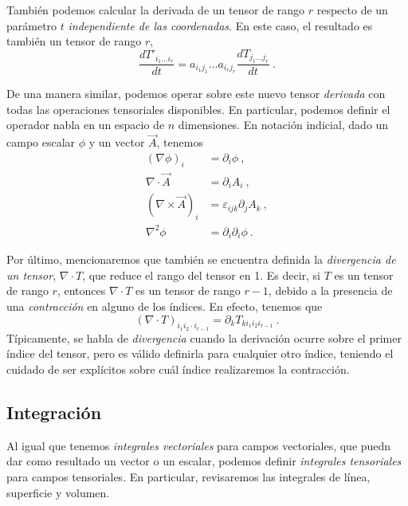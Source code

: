 También podemos calcular la derivada de un tensor de rango $r$ respecto de un parámetro $t$ \emph{independiente de las coordenadas}. En este caso, el resultado es también un tensor de rango $r$,
\begin{equation}
    \frac{d T'_{i_1 \dots i_r}}{dt} = a_{i_1 j_1} \dots a_{i_r j_r} \frac{dT_{j_1 \dots j_r}}{dt} \ . 
\end{equation}

De una manera similar, podemos operar sobre este nuevo tensor \emph{derivada} con todas las operaciones tensoriales disponibles. En particular, podemos definir el operador nabla en un espacio de $n$ dimensiones. En notación indicial, dado un campo escalar $\phi$ y un vector $\vec{A}$, tenemos
\begin{align}
    (\nabla \phi)_i & = \partial_i \phi \ , \\
    \nabla \cdot \vec{A} & = \partial_i A_i \ , \\
    (\nabla \times \vec{A})_i & = \varepsilon_{ijk} \partial_j A_k \ , \\
    \nabla^2 \phi & = \partial_i \partial_i \phi \ .
\end{align}

Por último, mencionaremos que también se encuentra definida la \emph{divergencia de un tensor}, $\nabla \cdot T$, que reduce el rango del tensor en 1. Es decir, si $T$ es un tensor de rango $r$, entonces $\nabla \cdot T$ es un tensor de rango $r-1$, debido a la presencia de una \emph{contracción} en alguno de los índices. En efecto, tenemos que
\begin{equation*}
    (\nabla \cdot T)_{i_1 i_2 \cdot i_{r-1}} = \partial_k T_{k i_1 i_2 i_{r-1}} \ .
\end{equation*}
Típicamente, se habla de \emph{divergencia} cuando la derivación ocurre sobre el primer índice del tensor, pero es válido definirla para cualquier otro índice, teniendo el cuidado de ser explícitos sobre cuál índice realizaremos la contracción.


\subsection{Integración}

Al igual que tenemos \emph{integrales vectoriales} para campos vectoriales, que puedn dar como resultado un vector o un escalar, podemos definir \emph{integrales tensoriales} para campos tensoriales. En particular, revisaremos las integrales de línea, superficie y volumen.

